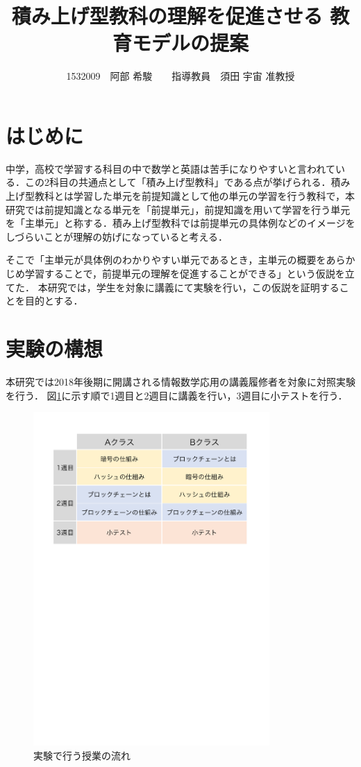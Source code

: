 \documentclass[twocolumn,10pt,a4j]{jsarticle}
\title{積み上げ型教科の理解を促進させる
教育モデルの提案}
\author{1532009　阿部 希駿　　指導教員　須田 宇宙 准教授}
\date{}
\begin{document}
\maketitle

\section{はじめに}

中学，高校で学習する科目の中で数学と英語は苦手になりやすいと言われている\cite{1}．この2科目の共通点として「積み上げ型教科」である点が挙げられる．積み上げ型教科とは学習した単元を前提知識として他の単元の学習を行う教科で，本研究では前提知識となる単元を「前提単元」，前提知識を用いて学習を行う単元を「主単元」と称する．積み上げ型教科では前提単元の具体例などのイメージをしづらいことが理解の妨げになっていると考える．

そこで「主単元が具体例のわかりやすい単元であるとき，主単元の概要をあらかじめ学習することで，前提単元の理解を促進することができる」という仮説を立てた．
本研究では，学生を対象に講義にて実験を行い，この仮説を証明することを目的とする．



\section{実験の構想}

本研究では2018年後期に開講される情報数学応用の講義履修者を対象に対照実験を行う．
図\ref{fig:time}に示す順で1週目と2週目に講義を行い，3週目に小テストを行う．

\begin{figure}[H]
\centering
\includegraphics[mediaboxonly=/CropBox,width=9cm]{timeline.pdf}
\caption{実験で行う授業の流れ}
\label{fig:time}
\end{figure}
\end{document}
